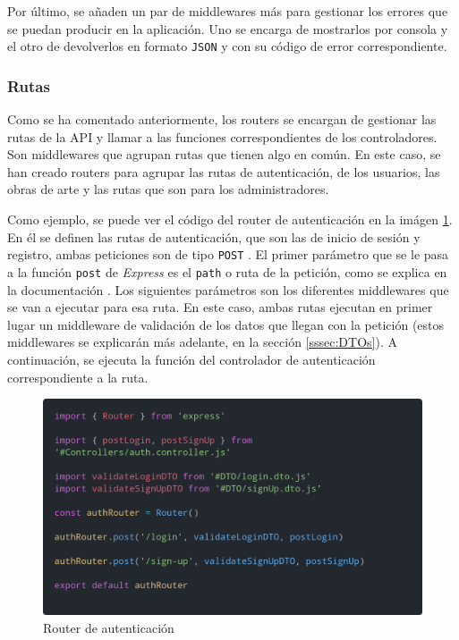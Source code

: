 Por último, se añaden un par de middlewares más para gestionar los errores que se
puedan producir en la aplicación. Uno se encarga de mostrarlos por consola y el otro
de devolverlos en formato \texttt{JSON} y con su código de error correspondiente.

\subsubsection{Rutas}
Como se ha comentado anteriormente, los routers se encargan de gestionar las rutas
de la API y llamar a las funciones correspondientes de los controladores. Son
middlewares que agrupan rutas que tienen algo en común. En este caso, se han creado
routers para agrupar las rutas de autenticación, de los usuarios, las obras de arte
y las rutas que son para los administradores.

Como ejemplo, se puede ver el código del router de autenticación en la imágen
\ref{fig:auth-router}. En él se definen las rutas de autenticación, que son las de
inicio de sesión y registro, ambas peticiones son de tipo \texttt{POST} \cite{post-request}.
El primer parámetro que se le pasa a la función \texttt{post} de \textit{Express}
es el \texttt{path} o ruta de la petición, como se explica en la documentación
\cite{express-router}. Los siguientes parámetros son los diferentes middlewares que
se van a ejecutar para esa ruta. En este caso, ambas rutas ejecutan en primer lugar
un middleware de validación de los datos que llegan con la petición (estos middlewares
se explicarán más adelante, en la sección \ref{sssec:DTOs}). A continuación, se ejecuta
la función del controlador de autenticación correspondiente a la ruta.

\begin{figure}[H]
  \centering
  \includegraphics[width=1\textwidth]{img/auth-router}
  \caption{Router de autenticación}
  \label{fig:auth-router}
\end{figure}


